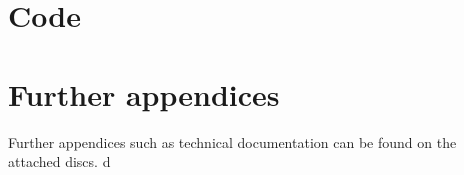 
\begin{appendices}

\chapter{Code}


\chapter{Further appendices}

Further appendices such as technical documentation can be found on the attached discs.
d


\end{appendices}